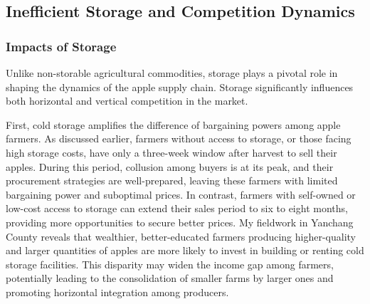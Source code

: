 


\subsection{Inefficient Storage and Competition Dynamics}


\subsubsection{Impacts of Storage}
\noindent Unlike non-storable agricultural commodities, storage plays a pivotal role in shaping the dynamics of the apple supply chain. Storage significantly influences both horizontal and vertical competition in the market.

First, cold storage amplifies the difference of bargaining powers among apple farmers. As discussed earlier, farmers without access to storage, or those facing high storage costs, have only a three-week window after harvest to sell their apples. During this period, collusion among buyers is at its peak, and their procurement strategies are well-prepared, leaving these farmers with limited bargaining power and suboptimal prices. In contrast, farmers with self-owned or low-cost access to storage can extend their sales period to six to eight months, providing more opportunities to secure better prices. My fieldwork in Yanchang County reveals that wealthier, better-educated farmers producing higher-quality and larger quantities of apples are more likely to invest in building or renting cold storage facilities. This disparity may widen the income gap among farmers, potentially leading to the consolidation of smaller farms by larger ones and promoting horizontal integration among producers.

